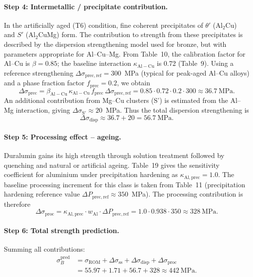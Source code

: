 \documentclass[12pt,a4paper]{article}
\begin{document}
	\paragraph{Step 4: Intermetallic / precipitate contribution.}
	In the artificially aged (T6) condition, fine coherent precipitates of
	$\theta'$ (Al$_2$Cu) and $S'$ (Al$_2$CuMg) form. The contribution to
	strength from these precipitates is described by the dispersion strengthening
	model used for bronze, but with parameters appropriate for Al--Cu--Mg.
	From Table~10, the calibration factor for Al--Cu is $\beta=0.85$; the
	baseline interaction $\kappa_{\mathrm{Al-Cu}}$ is 0.72 (Table~9). Using a
	reference strengthening $\Delta\sigma_{\mathrm{prec,ref}}=300$~MPa (typical for
	peak-aged Al--Cu alloys) and a phase fraction factor $f_{\mathrm{prec}}=0.2$,
	we obtain
	\[
	\Delta\sigma_{\mathrm{prec}} = \beta_{\mathrm{Al-Cu}}\,\kappa_{\mathrm{Al-Cu}}\,
	f_{\mathrm{prec}}\,\Delta\sigma_{\mathrm{prec,ref}}
	= 0.85\cdot0.72\cdot0.2\cdot300 \approx 36.7\ \text{MPa}.
	\]
	An additional contribution from Mg--Cu clusters (S') is estimated from the
	Al--Mg interaction, giving $\Delta\sigma_{\mathrm{S'}} \approx 20$~MPa.
	Thus the total dispersion strengthening is
	\[
	\Delta\sigma_{\mathrm{disp}} \approx 36.7 + 20 = 56.7\ \text{MPa}.
	\]
	
	\paragraph{Step 5: Processing effect – ageing.}
	Duralumin gains its high strength through solution treatment followed by
	quenching and natural or artificial ageing. Table~19 gives the sensitivity
	coefficient for aluminium under precipitation hardening as
	$\kappa_{\mathrm{Al,prec}}=1.0$. The baseline processing increment for
	this class is taken from Table~11 (precipitation hardening reference value
	$\Delta P_{\mathrm{prec,ref}}\approx 350$~MPa). The processing contribution
	is therefore
	\[
	\Delta\sigma_{\mathrm{proc}} = \kappa_{\mathrm{Al,prec}}\cdot w_{\mathrm{Al}}\cdot
	\Delta P_{\mathrm{prec,ref}} = 1.0\cdot0.938\cdot350 \approx 328\ \text{MPa}.
	\]
	
	\paragraph{Step 6: Total strength prediction.}
	Summing all contributions:
	\[
	\begin{aligned}
		\sigma_B^{\mathrm{pred}} &=
		\sigma_{\mathrm{ROM}} + \Delta\sigma_{\mathrm{ss}} +
		\Delta\sigma_{\mathrm{disp}} + \Delta\sigma_{\mathrm{proc}} \\
		&= 55.97 + 1.71 + 56.7 + 328 \approx 442\ \text{MPa}.
	\end{aligned}
	\]
	
\end{document}
